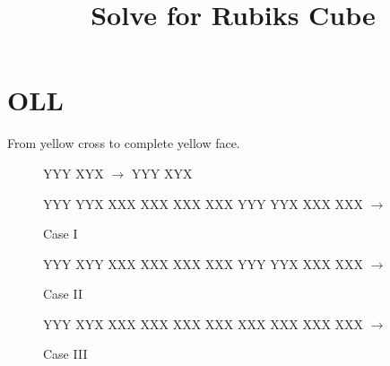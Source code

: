 \documentclass[11pt]{article}
\title{\vspace{-2cm}Solve for Rubiks Cube}
\begin{document}
\maketitle

\section{OLL}

From yellow cross to complete yellow face.

\begin{figure}[H]
    \centering
                {Y}{Y}{Y}%
                {X}{Y}{X}%
    \qquad$\longrightarrow$\qquad%
                {Y}{Y}{Y}%
                {X}{Y}{X}%
\end{figure}

\begin{figure}[H]
                {Y}{Y}{Y}%
                {Y}{Y}{X}%
                {X}{X}{X}%
                {X}{X}{X}%
                {X}{X}{X}%
                {X}{X}{X}%
                {Y}{Y}{Y}%
                {Y}{Y}{X}%
            {X}{X}{X}%
            {X}{X}{X}%
    \qquad$\longrightarrow$\qquad%
    \caption{Case I}
\end{figure}

\begin{figure}[H]
                {Y}{Y}{Y}%
                {X}{Y}{Y}%
                {X}{X}{X}%
                {X}{X}{X}%
                {X}{X}{X}%
                {X}{X}{X}%
                {Y}{Y}{Y}%
                {Y}{Y}{X}%
            {X}{X}{X}%
            {X}{X}{X}%
    \qquad$\longrightarrow$\qquad%
    \caption{Case II}
\end{figure}

\begin{figure}[H]
                {Y}{Y}{Y}%
                {X}{Y}{X}%
                {X}{X}{X}%
                {X}{X}{X}%
                {X}{X}{X}%
                {X}{X}{X}%
                {X}{X}{X}%
                {X}{X}{X}%
            {X}{X}{X}%
            {X}{X}{X}%
    \qquad$\longrightarrow$\qquad%
    \caption{Case III}
\end{figure}
\end{document}
